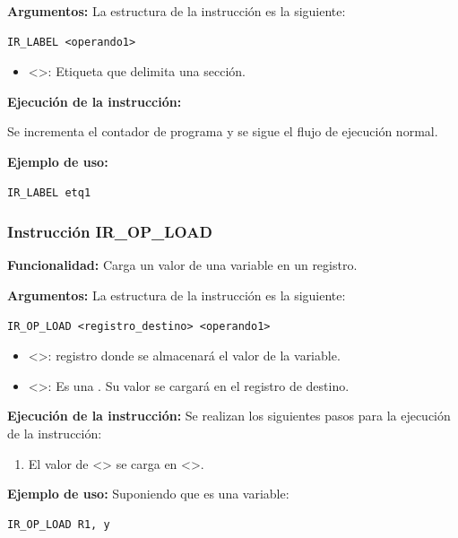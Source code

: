 \noindent
\textbf{Argumentos:} La estructura de la instrucción es la siguiente:
\begin{verbatim}
IR_LABEL <operando1>
\end{verbatim}
\begin{itemize}
    \item <>: Etiqueta que delimita una sección.
\end{itemize}

\noindent
\textbf{Ejecución de la instrucción:}


\noindent
Se incrementa el contador de programa y se sigue el flujo de ejecución normal.


\noindent
\textbf{Ejemplo de uso:}
\begin{verbatim}
IR_LABEL etq1
\end{verbatim}

\subsubsection{Instrucción IR\_OP\_LOAD}\label{subsubsec:IR_OP_LOAD}
\noindent
\textbf{Funcionalidad:} Carga un valor de una variable en un registro.

\noindent
\textbf{Argumentos:} La estructura de la instrucción es la siguiente:
\begin{verbatim}
IR_OP_LOAD <registro_destino> <operando1>
\end{verbatim}
\begin{itemize}
    \item <>: registro donde se almacenará el valor de la variable.
    \item <>: Es una . Su valor se cargará en el registro de destino.
\end{itemize}

\noindent
\textbf{Ejecución de la instrucción:}
\noindent
Se realizan los siguientes pasos para la ejecución de la instrucción:

\begin{enumerate}
    \item El valor de <> se carga en <>.
\end{enumerate}

\noindent
\textbf{Ejemplo de uso:}
\noindent
Suponiendo que  es una variable:

\begin{verbatim}
IR_OP_LOAD R1, y
\end{verbatim}

